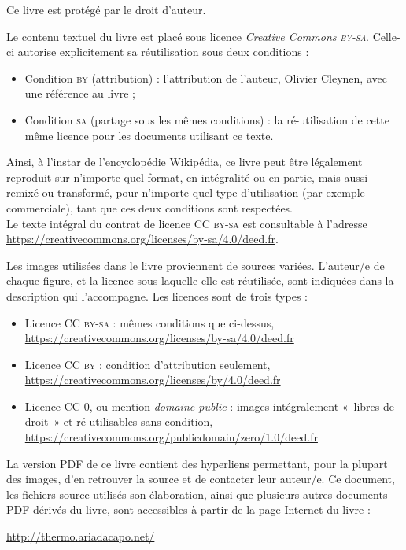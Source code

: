 {\setlength{\parindent}{0pt}
	Ce livre est protégé par le droit d’auteur.

	Le contenu textuel du livre est placé sous licence \textit{Creative Commons \textsc{by-sa}}. Celle-ci autorise explicitement sa réutilisation sous deux conditions : 
	\begin{itemize}
		\renewcommand\labelitemi{\ccAttribution}
		\item Condition \textsc{by} (attribution) : l’attribution de l’auteur, Olivier Cleynen, avec une référence au livre ;
		\renewcommand\labelitemi{\ccShareAlike}
		\item Condition \textsc{sa} (partage sous les mêmes conditions) : la ré-utilisation de cette même licence pour les documents utilisant ce texte.
	\end{itemize}

	Ainsi, à l’instar de l’encyclopédie Wikipédia, ce livre peut être légalement reproduit sur n’importe quel format, en intégralité ou en partie, mais aussi remixé ou transformé, pour n’importe quel type d’utilisation (par exemple commerciale), tant que ces deux conditions sont respectées.\\
	Le texte intégral du contrat de licence \textsc{CC by-sa} est consultable à l’adresse \href{https://creativecommons.org/licenses/by-sa/4.0/deed.fr}{https://creativecommons.org/licenses/by-sa/4.0/deed.fr}.

	Les images utilisées dans le livre proviennent de sources variées. L’auteur/e de chaque figure, et la licence sous laquelle elle est réutilisée, sont indiquées dans la description qui l’accompagne. Les licences sont de trois types : 
	\begin{itemize}
		\item Licence \textsc{CC by-sa} : mêmes conditions que ci-dessus,\\
					\href{https://creativecommons.org/licenses/by-sa/4.0/deed.fr}{https://creativecommons.org/licenses/by-sa/4.0/deed.fr}
		\item Licence \textsc{CC by} : condition d’attribution seulement,\\
					\href{https://creativecommons.org/licenses/by/4.0/deed.fr}{https://creativecommons.org/licenses/by/4.0/deed.fr}
		\item Licence \textsc{CC 0}, ou mention \textit{domaine public} : images intégralement «~libres de droit~» et ré-utilisables sans condition,\\
					\href{https://creativecommons.org/publicdomain/zero/1.0/deed.fr}{https://creativecommons.org/publicdomain/zero/1.0/deed.fr}
	\end{itemize}

	La version PDF de ce livre contient des hyperliens permettant, pour la plupart des images, d’en retrouver la source et de contacter leur auteur/e. Ce document, les fichiers source utilisés son élaboration, ainsi que plusieurs autres documents PDF dérivés du livre, sont accessibles à partir de la page Internet du livre :

		\begin{center}\href{http://thermo.ariadacapo.net/}{http://thermo.ariadacapo.net/}\end{center}
}

